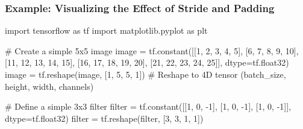 \documentclass[
  letterpaper,
  DIV=11,
  numbers=noendperiod]{scrreprt}
\newenvironment{Shaded}{\begin{snugshade}}{\end{snugshade}}
\newcommand{\BuiltInTok}[1]{\textcolor[rgb]{0.00,0.23,0.31}{#1}}
\newcommand{\CommentTok}[1]{\textcolor[rgb]{0.37,0.37,0.37}{#1}}
\newcommand{\DecValTok}[1]{\textcolor[rgb]{0.68,0.00,0.00}{#1}}
\newcommand{\ImportTok}[1]{\textcolor[rgb]{0.00,0.46,0.62}{#1}}
\newcommand{\NormalTok}[1]{\textcolor[rgb]{0.00,0.23,0.31}{#1}}
\newcommand{\OperatorTok}[1]{\textcolor[rgb]{0.37,0.37,0.37}{#1}}
\begin{document}
\subsubsection{Example: Visualizing the Effect of Stride and
Padding}\label{example-visualizing-the-effect-of-stride-and-padding}

\begin{Shaded}
\begin{Highlighting}[]
\ImportTok{import}\NormalTok{ tensorflow }\ImportTok{as}\NormalTok{ tf}
\ImportTok{import}\NormalTok{ matplotlib.pyplot }\ImportTok{as}\NormalTok{ plt}

\CommentTok{\# Create a simple 5x5 image}
\NormalTok{image }\OperatorTok{=}\NormalTok{ tf.constant([[}\DecValTok{1}\NormalTok{, }\DecValTok{2}\NormalTok{, }\DecValTok{3}\NormalTok{, }\DecValTok{4}\NormalTok{, }\DecValTok{5}\NormalTok{],}
\NormalTok{                     [}\DecValTok{6}\NormalTok{, }\DecValTok{7}\NormalTok{, }\DecValTok{8}\NormalTok{, }\DecValTok{9}\NormalTok{, }\DecValTok{10}\NormalTok{],}
\NormalTok{                     [}\DecValTok{11}\NormalTok{, }\DecValTok{12}\NormalTok{, }\DecValTok{13}\NormalTok{, }\DecValTok{14}\NormalTok{, }\DecValTok{15}\NormalTok{],}
\NormalTok{                     [}\DecValTok{16}\NormalTok{, }\DecValTok{17}\NormalTok{, }\DecValTok{18}\NormalTok{, }\DecValTok{19}\NormalTok{, }\DecValTok{20}\NormalTok{],}
\NormalTok{                     [}\DecValTok{21}\NormalTok{, }\DecValTok{22}\NormalTok{, }\DecValTok{23}\NormalTok{, }\DecValTok{24}\NormalTok{, }\DecValTok{25}\NormalTok{]], dtype}\OperatorTok{=}\NormalTok{tf.float32)}
\NormalTok{image }\OperatorTok{=}\NormalTok{ tf.reshape(image, [}\DecValTok{1}\NormalTok{, }\DecValTok{5}\NormalTok{, }\DecValTok{5}\NormalTok{, }\DecValTok{1}\NormalTok{])  }\CommentTok{\# Reshape to 4D tensor (batch\_size, height, width, channels)}

\CommentTok{\# Define a simple 3x3 filter}
\BuiltInTok{filter} \OperatorTok{=}\NormalTok{ tf.constant([[}\DecValTok{1}\NormalTok{, }\DecValTok{0}\NormalTok{, }\OperatorTok{{-}}\DecValTok{1}\NormalTok{], [}\DecValTok{1}\NormalTok{, }\DecValTok{0}\NormalTok{, }\OperatorTok{{-}}\DecValTok{1}\NormalTok{], [}\DecValTok{1}\NormalTok{, }\DecValTok{0}\NormalTok{, }\OperatorTok{{-}}\DecValTok{1}\NormalTok{]], dtype}\OperatorTok{=}\NormalTok{tf.float32)}
\BuiltInTok{filter} \OperatorTok{=}\NormalTok{ tf.reshape(}\BuiltInTok{filter}\NormalTok{, [}\DecValTok{3}\NormalTok{, }\DecValTok{3}\NormalTok{, }\DecValTok{1}\NormalTok{, }\DecValTok{1}\NormalTok{])}


\end{Highlighting}
\end{Shaded}
\end{document}

